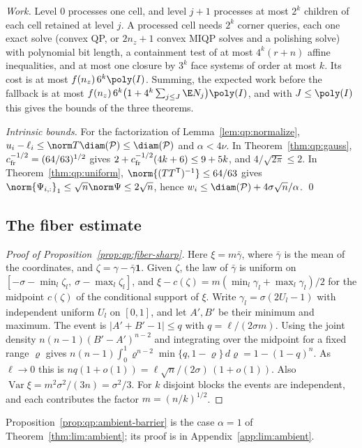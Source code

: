 \emph{Work.} Level $0$ processes one cell, and level $j+1$ processes at most
$2^k$ children of each cell retained at level $j$. A processed cell needs $2^k$
corner queries, each one exact solve (convex QP, or $2n_z+1$ convex MIQP solves
and a polishing solve) with polynomial bit length, a containment test of at
most $4^k(r+n)$ affine inequalities, and at most one closure by $3^k$ face
systems of order at most $k$. Its cost is at most
$f(n_z)\,6^k\poly(I)$. Summing, the expected work before the fallback is at
most $f(n_z)\,6^k\bigl(1+4^k\sum_{j\le J}\E N_j\bigr)\poly(I)$, and with
$J\le\poly(I)$ this gives the bounds of the three theorems.

\emph{Intrinsic bounds.} For the factorization of Lemma~\ref{lem:qp:normalize},
$u_i-\ell_i\le\norm T\diam(\mathcal P)\le\diam(\mathcal P)$ and $\alpha<4\nu$.
In Theorem~\ref{thm:qp:gauss}, $c_{\rm fr}^{-1/2}=(64/63)^{1/2}$ gives
$2+c_{\rm fr}^{-1/2}(4k+6)\le9+5k$, and $4/\sqrt{2\pi}\le2$. In
Theorem~\ref{thm:qp:uniform}, $\norm{(TT^{\mathsf T})^{-1}}\le64/63$ gives
$\norm{\Psi_{i,:}}_1\le\sqrt n\norm\Psi\le2\sqrt n$, hence
$w_i\le\diam(\mathcal P)+4\sigma\sqrt n/\alpha$. \qed

\subsection{The fiber estimate}

\begin{proof}[Proof of Proposition~\ref{prop:qp:fiber-sharp}]
Here $\xi=m\bar\gamma$, where $\bar\gamma$ is the mean of the coordinates, and
$\zeta=\gamma-\bar\gamma\mathbf1$. Given $\zeta$, the law of $\bar\gamma$ is
uniform on $[-\sigma-\min_l\zeta_l,\ \sigma-\max_l\zeta_l]$, and
$\xi-c(\zeta)=m(\min_l\gamma_l+\max_l\gamma_l)/2$ for the midpoint $c(\zeta)$
of the conditional support of $\xi$. Write $\gamma_l=\sigma(2U_l-1)$ with
independent uniform $U_l$ on $[0,1]$, and let $A',B'$ be their minimum and
maximum. The event is $|A'+B'-1|\le q$ with $q=\ell/(2\sigma m)$. Using the
joint density $n(n-1)(B'-A')^{n-2}$ and integrating over the midpoint for a
fixed range $\varrho$ gives
$n(n-1)\int_0^1\varrho^{n-2}\min\{q,1-\varrho\}\,d\varrho=1-(1-q)^n$. As
$\ell\to0$ this is $nq(1+o(1))=\ell\sqrt n/(2\sigma)\,(1+o(1))$. Also
$\operatorname{Var}\xi=m^2\sigma^2/(3n)=\sigma^2/3$. For $k$ disjoint blocks the
events are independent, and each contributes the factor $m=(n/k)^{1/2}$.
\end{proof}

Proposition~\ref{prop:qp:ambient-barrier} is the case $\alpha=1$ of
Theorem~\ref{thm:lim:ambient}; its proof is in Appendix~\ref{app:lim:ambient}.

